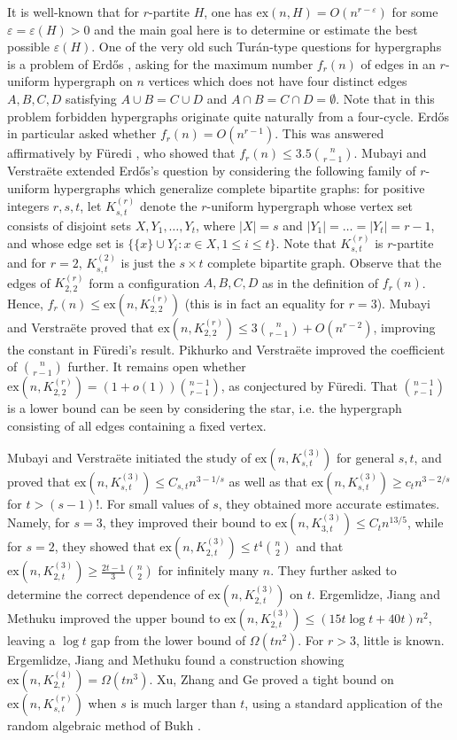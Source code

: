 \documentclass[a4paper,11pt]{article}
\theoremstyle{definition}
\def\ex{\mathrm{ex}}
\begin{document}
It is well-known that for $r$-partite $H$, one has $\ex(n,H) = O(n^{r - \varepsilon})$ for some $\varepsilon = \varepsilon(H) > 0$ and the main goal here is to determine or estimate the best possible $\varepsilon(H)$.
One of the very old such Tur\'an-type questions for hypergraphs is a problem of Erd\H{o}s \cite{Erdos77}, asking for the maximum number $f_r(n)$ of edges in an $r$-uniform hypergraph on $n$ vertices which does not have four distinct edges $A,B,C,D$ satisfying $A \cup B = C \cup D$ and $A \cap B = C \cap D = \emptyset$. Note that in this problem forbidden hypergraphs originate quite naturally from a four-cycle. 
Erd\H{o}s in particular asked whether $f_r(n) = O(n^{r-1})$. 
This was answered affirmatively by F\"uredi \cite{Fur84}, who showed that $f_r(n) \leq 3.5 \binom{n}{r-1}$. 
Mubayi and Verstra\"ete \cite{MV04} extended Erd\H{o}s's question by considering the following family of $r$-uniform hypergraphs which generalize complete bipartite graphs: 
for positive integers $r,s,t$, let $K_{s,t}^{(r)}$ denote the $r$-uniform hypergraph whose vertex set consists of disjoint sets $X,Y_1,\dots,Y_t$, where $|X| = s$ and $|Y_1| = \dots = |Y_t| = r-1$, and whose edge set is $\{\{x\} \cup Y_i: x \in X, 1\leq i\leq t\}$. Note that $K_{s,t}^{(r)}$ is $r$-partite and for $r = 2$, $K_{s,t}^{(2)}$ is just the $s \times t$ complete bipartite graph. Observe that the edges of $K^{(r)}_{2,2}$ form a configuration $A,B,C,D$ as in the definition of $f_r(n)$. Hence, $f_r(n) \leq \ex(n,K_{2,2}^{(r)})$ (this is in fact an equality for $r = 3$). Mubayi and Verstra\"ete \cite{MV04} proved that $\ex(n,K_{2,2}^{(r)})\leq 3\binom{n}{r-1}+O(n^{r-2})$, improving the constant in F\"uredi's result.  Pikhurko and Verstra\"ete \cite{PV09} improved the coefficient of $\binom{n}{r-1}$ further. It remains open whether $\ex(n,K_{2,2}^{(r)}) = (1 + o(1)) \binom{n-1}{r-1}$, as conjectured by F\"uredi. That $\binom{n-1}{r-1}$ is a lower bound can be seen by considering the star, i.e. the hypergraph consisting of all edges containing a fixed vertex. 

Mubayi and Verstra\"ete \cite{MV04} initiated the study of $\ex(n,K_{s,t}^{(3)})$ for general $s,t$, and proved that
$\ex(n,K_{s,t}^{(3)})\leq C_{s,t}n^{3-1/s}$ as well as that $\ex(n,K_{s,t}^{(3)})\geq c_t n^{3-2/s}$ for $t>(s-1)!$. For small values of $s$, they obtained more accurate estimates. Namely, for $s=3$, they improved their bound to $\ex(n,K_{3,t}^{(3)})\leq C_tn^{13/5}$, while
 for $s = 2$, they showed that $\ex(n,K_{2,t}^{(3)})\leq t^4 \binom{n}{2}$ and that $\ex(n,K_{2,t}^{(3)})\geq \frac{2t-1}{3}\binom{n}{2}$ for infinitely many $n$. They further asked to determine the correct dependence of $\ex(n,K_{2,t}^{(3)})$ on $t$. Ergemlidze, Jiang and Methuku \cite{EJM20} improved the upper bound to $\ex(n,K_{2,t}^{(3)})\leq (15t\log t+40t)n^2$, leaving a $\log t$ gap from the lower bound of $\Omega(tn^2)$. For $r > 3$, little is known. Ergemlidze, Jiang and Methuku found a construction showing $\ex(n, K_{2,t}^{(4)}) = \Omega(tn^3)$. Xu, Zhang and Ge \cite{XZG20,XZG21} proved a tight bound on $\ex(n,K_{s,t}^{(r)})$ when $s$ is much larger than $t$, using a standard application of the random algebraic method of Bukh \cite{Bukh15}. 
\end{document}
